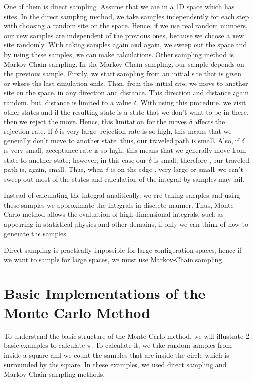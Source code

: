 \documentclass[12pt,fleqn]{report}
\begin{document}
One of them is direct sampling. 
Assume that we are in a 1D space which has sites. 
In the direct sampling method, we take samples independently for each step with choosing a random site on the space. Hence, if we use real random numbers, our new samples are independent of the previous ones, because we choose a new site randomly. With taking samples again and again, we sweep out the space and by using these samples, we can make calculations. Other sampling method is Markov-Chain sampling. In the Markov-Chain sampling, our sample depends on the previous sample. Firstly, we start sampling from an initial site that is given or where the last simulation ends.  Then, from the initial site, we move to another site on the space, in any direction and distance. This direction and distance again random, but, distance is limited to a value $\delta$. With using this procedure, we visit other states and if the resulting state is a state that we don't want to be in there, then we reject the move. Hence, this limitation for the moves $\delta$ affects the rejection rate. If $\delta$ is very large, rejection rate is so high, this means that we generally don't move to another state; thus, our traveled path is small. Also, if $\delta$ is very small, acceptance rate is so high, this means that we generally move from state to another state; however, in this case our $\delta$ is small; therefore , our traveled path is, again, small. Thus, when $\delta$ is on the edge , very large or small, we can't sweep out most of the states and calculation of the integral by samples may fail. 

Instead of calculating the integral analitically, we are taking samples and using these samples we approximate the integrals in discrete manner. Thus, Monte Carlo method allows the evaluation of high dimensional integrals, such as appearing in statistical physics and other domains, if only we can think of how to generate the samples. \cite[p. 8]{krauth}

Direct sampling is practically impossible for large configuration spaces, hence if we want to sample for large spaces, we must use Markov-Chain sampling. 
	
\section{Basic Implementations of the Monte Carlo Method}

To understand the basic structure of the Monte Carlo method, we will illustrate 2 basic examples to calculate $\pi$. To calculate it, we take random samples from inside a square and we count the samples that are inside the circle which is surrounded by the square. In these examples, we used direct sampling and Markov-Chain sampling methods.  
\end{document}
